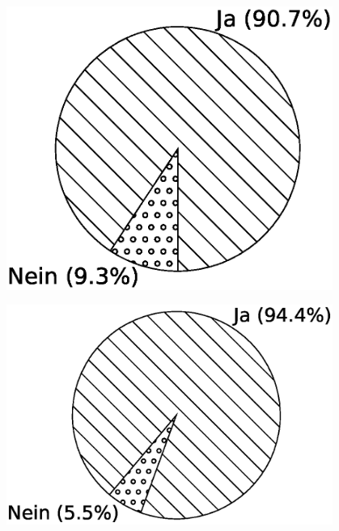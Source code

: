 \begin{minipage}{0.45\textwidth}
  \centering  
  \includegraphics[width=0.8\textwidth]{img/pi_standard_total.eps}
  \label{Chap:Eval-Sec:Stand-Fig:Total}
\end{minipage}
\hfill
\begin{minipage}{0.45\textwidth}
  \centering
  \includegraphics[width=0.8\textwidth]{img/pi_standard_mutex.eps}
  \label{Chap:Eval-Sec:Stand-Fig:Mutex}
\end{minipage}
